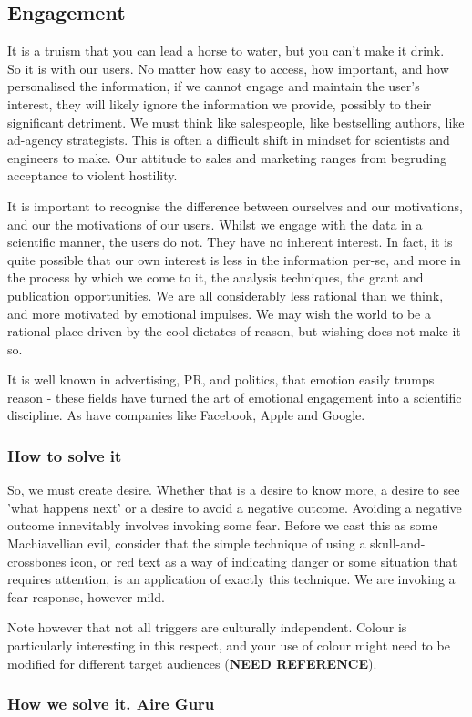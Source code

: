 \subsection{Engagement}
It is a truism that you can lead a horse to water, but you can't make it drink. \\

So it is with our users.
No matter how easy to access, how important, and how personalised the information, if we cannot engage and maintain the user's interest,
they will likely ignore the information we provide, possibly to their significant detriment.
We must think like salespeople, like bestselling authors, like ad-agency strategists.
This is often a difficult shift in mindset for scientists and engineers to make.
Our attitude to sales and marketing ranges from begruding acceptance to violent hostility.

It is important to recognise the difference between ourselves and our motivations, and our the motivations of our users. Whilst we engage with the data in a scientific
manner, the users do not. They have no inherent interest. In fact, it is quite possible that our own interest is less in the information per-se, and more in the process
by which we come to it, the analysis techniques, the grant and publication opportunities. We are all considerably less rational than we think, and more motivated by
emotional impulses. We may wish the world to be a rational place driven by the cool dictates of reason, but wishing does not make it so.

It is well known in advertising, PR, and politics, that emotion easily trumps reason - these fields have turned the art of emotional engagement into a scientific discipline.
As have companies like Facebook, Apple and Google.

\subsubsection{How to solve it}

So, we must create desire. Whether that is a desire to know more, a desire to see 'what happens next' or a desire to avoid a negative outcome.
Avoiding a negative outcome innevitably involves invoking some fear. Before we cast this as some Machiavellian evil, consider that the simple
technique of using a skull-and-crossbones icon, or red text as a way of indicating danger or some situation that requires attention, is an
application of exactly this technique. We are invoking a fear-response, however mild.

Note however that not all triggers are culturally independent. Colour is particularly interesting in this respect, and your use of colour might
need to be modified for different target audiences (\textbf{NEED REFERENCE}).

\subsubsection{How we solve it. Aire Guru}

\begin{itemize}
    \done
    \crossed
    
\end{itemize}
\newpage